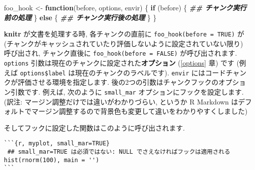 \documentclass[
  xelatex,ja=standard,jafont=noto]{bxjsreport}
\newenvironment{Shaded}{\begin{snugshade}}{\end{snugshade}}
\newcommand{\AttributeTok}[1]{\textcolor[rgb]{0.77,0.63,0.00}{#1}}
\newcommand{\CommentTok}[1]{\textcolor[rgb]{0.56,0.35,0.01}{\textit{#1}}}
\newcommand{\ControlFlowTok}[1]{\textcolor[rgb]{0.13,0.29,0.53}{\textbf{#1}}}
\newcommand{\DecValTok}[1]{\textcolor[rgb]{0.00,0.00,0.81}{#1}}
\newcommand{\DocumentationTok}[1]{\textcolor[rgb]{0.56,0.35,0.01}{\textbf{\textit{#1}}}}
\newcommand{\FunctionTok}[1]{\textcolor[rgb]{0.00,0.00,0.00}{#1}}
\newcommand{\NormalTok}[1]{#1}
\newcommand{\OtherTok}[1]{\textcolor[rgb]{0.56,0.35,0.01}{#1}}
\newcommand{\SpecialCharTok}[1]{\textcolor[rgb]{0.00,0.00,0.00}{#1}}
\newcommand{\StringTok}[1]{\textcolor[rgb]{0.31,0.60,0.02}{#1}}
\begin{document}
\begin{Shaded}
\begin{Highlighting}[numbers=left,,]
\NormalTok{foo\_hook }\OtherTok{\textless{}{-}} \ControlFlowTok{function}\NormalTok{(before, options, envir) \{}
  \ControlFlowTok{if}\NormalTok{ (before) \{}
    \DocumentationTok{\#\# チャンク実行前の処理}
\NormalTok{  \} }\ControlFlowTok{else}\NormalTok{ \{}
    \DocumentationTok{\#\# チャンク実行後の処理}
\NormalTok{  \}}
\NormalTok{\}}
\end{Highlighting}
\end{Shaded}

\textbf{knitr} が文書を処理する時, 各チャンクの直前に
\texttt{foo\_hook(before\ =\ TRUE)} が
(チャンクがキャッシュされていたり評価しないように設定されていない限り)
呼び出され, チャンク直後に \texttt{foo\_hook(before\ =\ FALSE)}
が呼び出されます. \texttt{options}
引数は現在のチャンクに設定された\textbf{オプション} (\ref{options} 章)
です (例えば \texttt{options\$label} は現在のチャンクのラベルです).
\texttt{envir} にはコードチャンクが評価させる環境を指定します.
後の2つの引数はチャンクフックのオプション引数です. 例えば, 次のように
\texttt{small\_mar} オプションにフックを設定します. (訳注:
マージン調整だけでは違いがわかりづらい, というか R Markdown
はデフォルトでマージン調整するので背景色も変更して違いをわかりやすくしました)

\begin{Shaded}
\end{Shaded}

そしてフックに設定した関数はこのように呼び出されます.

\begin{verbatim}
```{r, myplot, small_mar=TRUE}
 ## small_mar=TRUE は必須ではない: NULL でさえなければフックは適用される
hist(rnorm(100), main = '')
```
\end{verbatim}
\end{document}
